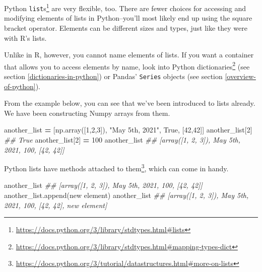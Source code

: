 \documentclass[
  12pt,
  krantz2]{krantz}
\makeatletter
\newenvironment{Shaded}{\begin{snugshade}}{\end{snugshade}}
\newcommand{\CommentTok}[1]{\textcolor[rgb]{0.37,0.37,0.37}{\textit{#1}}}
\newcommand{\DecValTok}[1]{\textcolor[rgb]{0.06,0.06,0.06}{#1}}
\newcommand{\NormalTok}[1]{#1}
\newcommand{\OperatorTok}[1]{\textcolor[rgb]{0.43,0.43,0.43}{\textbf{#1}}}
\newcommand{\StringTok}[1]{\textcolor[rgb]{0.5,0.5,0.5}{#1}}
\newcommand{\VariableTok}[1]{\textcolor[rgb]{0,0,0}{#1}}
\renewcommand{\href}[2]{#2\footnote{\url{#1}}}
\newenvironment{kframe}{%
\medskip{}
\setlength{\fboxsep}{.8em}
 \def\at@end@of@kframe{}%
 \ifinner\ifhmode%
  \def\at@end@of@kframe{\end{minipage}}%
  \begin{minipage}{\columnwidth}%
 \fi\fi%
 \def\FrameCommand##1{\hskip\@totalleftmargin \hskip-\fboxsep
 \colorbox{shadecolor}{##1}\hskip-\fboxsep
     \hskip-\linewidth \hskip-\@totalleftmargin \hskip\columnwidth}%
 \MakeFramed {\advance\hsize-\width
   \@totalleftmargin\z@ \linewidth\hsize
   \@setminipage}}%
 {\par\unskip\endMakeFramed%
 \at@end@of@kframe}
\renewenvironment{Shaded}{\begin{kframe}}{\end{kframe}}
\makeatother
\begin{document}
\href{https://docs.python.org/3/library/stdtypes.html\#lists}{Python \texttt{list}s} are very flexible, too. There are fewer choices for accessing and modifying elements of lists in Python--you'll most likely end up using the square bracket operator. Elements can be different sizes and types, just like they were with R's lists.

Unlike in R, however, you cannot name elements of lists. If you want a container that allows you to access elements by name, look into Python \href{https://docs.python.org/3/library/stdtypes.html\#mapping-types-dict}{dictionaries} (see section \ref{dictionaries-in-python}) or Pandas' \texttt{Series} objects (see section \ref{overview-of-python}).

From the example below, you can see that we've been introduced to lists already. We have been constructing Numpy arrays from them.

\begin{Shaded}
\begin{Highlighting}[]
\NormalTok{another\_list }\OperatorTok{=}\NormalTok{ [np.array([}\DecValTok{1}\NormalTok{,}\DecValTok{2}\NormalTok{,}\DecValTok{3}\NormalTok{]), }\StringTok{"May 5th, 2021"}\NormalTok{, }\VariableTok{True}\NormalTok{, [}\DecValTok{42}\NormalTok{,}\DecValTok{42}\NormalTok{]]}
\NormalTok{another\_list[}\DecValTok{2}\NormalTok{]}
\CommentTok{\#\# True}
\NormalTok{another\_list[}\DecValTok{2}\NormalTok{] }\OperatorTok{=} \DecValTok{100}
\NormalTok{another\_list}
\CommentTok{\#\# [array([1, 2, 3]), \textquotesingle{}May 5th, 2021\textquotesingle{}, 100, [42, 42]]}
\end{Highlighting}
\end{Shaded}

Python lists have \href{https://docs.python.org/3/tutorial/datastructures.html\#more-on-lists}{methods attached to them}, which can come in handy.

\begin{Shaded}
\begin{Highlighting}[]
\NormalTok{another\_list}
\CommentTok{\#\# [array([1, 2, 3]), \textquotesingle{}May 5th, 2021\textquotesingle{}, 100, [42, 42]]}
\NormalTok{another\_list.append(}\StringTok{\textquotesingle{}new element\textquotesingle{}}\NormalTok{)}
\NormalTok{another\_list}
\CommentTok{\#\# [array([1, 2, 3]), \textquotesingle{}May 5th, 2021\textquotesingle{}, 100, [42, 42], \textquotesingle{}new element\textquotesingle{}]}
\end{Highlighting}
\end{Shaded}
\end{document}
